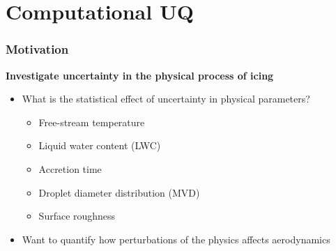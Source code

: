 \documentclass[9pt]{beamer}
\begin{document}
\section{Computational UQ}
\label{sec-4}
\begin{frame}
\frametitle{Motivation}
\label{sec-4-1}

\textbf{Investigate uncertainty in the physical process of icing}
\begin{itemize}
\item What is the statistical effect of uncertainty in physical parameters?
\begin{itemize}
\item Free-stream temperature
\item Liquid water content (LWC)
\item Accretion time
\item Droplet diameter distribution (MVD)
\item Surface roughness
\end{itemize}
\item Want to quantify how perturbations of the physics affects aerodynamics
\end{itemize}
\end{frame}
\end{document}
